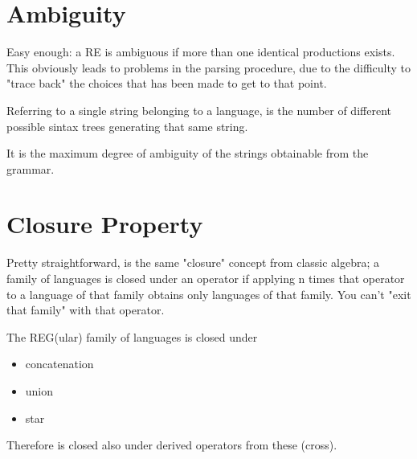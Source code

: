     \section{Ambiguity}
        Easy enough: a RE is ambiguous if more than one identical productions exists. This obviously leads to problems in the parsing procedure, due to the difficulty 
        to "trace back" the choices that has been made to get to that point. 
        \begin{definition}
            Referring to a single string belonging to a language, is the number of different possible sintax trees generating that same string.
        \end{definition}
        \begin{definition}
            It is the maximum degree of ambiguity of the strings obtainable from the grammar.
        \end{definition}

    \section{Closure Property}
        Pretty straightforward, is the same "closure" concept from classic algebra; a family of languages is closed under an operator if applying n times that 
        operator to a language of that family obtains only languages of that family. You can't "exit that family" with that operator.
        
        The REG(ular) family of languages is closed under
        \begin{itemize}
            \item concatenation
            \item union
            \item star
        \end{itemize}
        Therefore is closed also under derived operators from these (cross).
